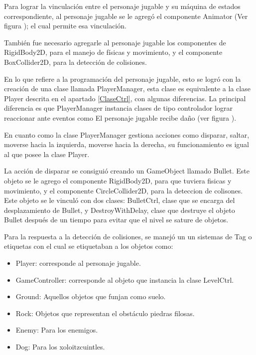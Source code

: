 Para lograr la vinculación entre el personaje jugable y su máquina de estados 
correspondiente, al personaje jugable se le agregó el componente Animator 
(Ver figura ); %
el cual permite esa vinculación.   
\\
\par 
También fue necesario agregarle al personaje jugable los componentes de 
RigidBody2D, para el manejo de físicas y movimiento, y el componente 
BoxCollider2D, para la detección de colisiones.
\\
\par 
En lo que refiere a la programación del personaje jugable, esto se logró con
la creación de una clase llamada PlayerManager, esta clase es equivalente a 
la clase Player descrita en el apartado \ref{ClaseCtrl}, con algunas diferencias.
La principal diferencia es que PlayerManager instancia clases de tipo controlador 
lograr reaccionar ante eventos como El personaje jugable recibe daño (ver figura ).
\\
\par 
En cuanto como la clase PlayerManager gestiona acciones como disparar, saltar, 
moverse hacia la izquierda, moverse hacia la derecha, su funcionamiento es igual
al que posee la clase Player.
\\
\par 
La acción de disparar se consiguió creando un GameObject llamado Bullet. 
Este objeto se le agrego el componente RigidBody2D, para que tuviera fisicas y 
movimiento, y el componente CircleCollider2D, para la deteccion de colisones. 
Este objeto se le vinculó con dos clases: BulletCtrl, clase que se 
encarga del desplazamiento de Bullet, y DestroyWithDelay, clase que destruye el 
objeto Bullet después de un tiempo para evitar que el nivel se sature de objetos.
\\
\par
Para la respuesta a la detección de colisiones, se manejó un un sistemas de Tag 
o etiquetas con el cual se etiquetaban a los objetos como: 
\begin{itemize}
	\item Player: corresponde al personaje jugable.
	\item GameController: corresponde al objeto que instancia la clase LevelCtrl.
	\item Ground: Aquellos objetos que funjan como suelo.
	\item Rock: Objetos que representan el obstáculo piedras filosas.
	\item Enemy: Para los enemigos.
	\item Dog: Para los xoloitzcuintles.
\end{itemize}   
